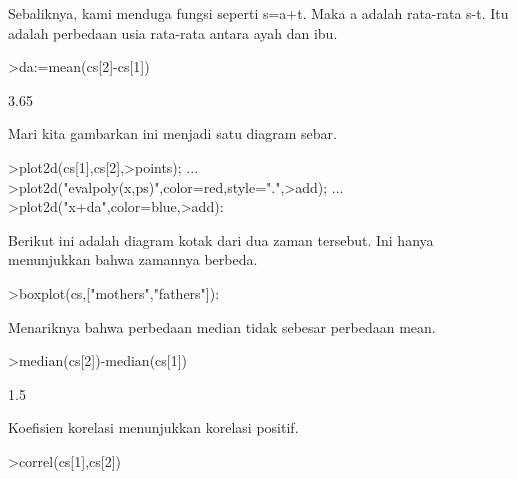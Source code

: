 \documentclass[a4paper,10pt]{article}
\begin{document}
\begin{eulernotebook}
\begin{eulercomment}
\begin{eulercomment}
\begin{eulercomment}
\begin{eulercomment}
\begin{eulercomment}
\begin{eulercomment}
\begin{eulercomment}
\begin{eulercomment}
\begin{eulercomment}
\begin{eulercomment}
\begin{eulercomment}
\begin{eulercomment}
\begin{eulercomment}
\begin{eulercomment}
\begin{eulercomment}
\begin{eulercomment}
\begin{eulercomment}
\begin{eulercomment}
\begin{eulercomment}
\begin{eulercomment}
\begin{eulercomment}
\begin{eulercomment}
\begin{eulercomment}
\begin{eulercomment}
\begin{eulercomment}
\begin{eulercomment}
\begin{eulercomment}
\begin{eulercomment}
\begin{eulercomment}
\begin{eulercomment}
\begin{eulercomment}
\begin{eulercomment}
\begin{eulercomment}
Sebaliknya, kami menduga fungsi seperti s=a+t. Maka a adalah rata-rata
s-t. Itu adalah perbedaan usia rata-rata antara ayah dan ibu.
\end{eulercomment}
\begin{eulerprompt}
>da:=mean(cs[2]-cs[1])
\end{eulerprompt}
\begin{euleroutput}
  3.65
\end{euleroutput}
\begin{eulercomment}
Mari kita gambarkan ini menjadi satu diagram sebar.
\end{eulercomment}
\begin{eulerprompt}
>plot2d(cs[1],cs[2],>points);  ...
>plot2d("evalpoly(x,ps)",color=red,style=".",>add);  ...
>plot2d("x+da",color=blue,>add):
\end{eulerprompt}
\begin{eulercomment}
Berikut ini adalah diagram kotak dari dua zaman tersebut. Ini hanya
menunjukkan bahwa zamannya berbeda.
\end{eulercomment}
\begin{eulerprompt}
>boxplot(cs,["mothers","fathers"]):
\end{eulerprompt}
\begin{eulercomment}
Menariknya bahwa perbedaan median tidak sebesar perbedaan mean.
\end{eulercomment}
\begin{eulerprompt}
>median(cs[2])-median(cs[1])
\end{eulerprompt}
\begin{euleroutput}
  1.5
\end{euleroutput}
\begin{eulercomment}
Koefisien korelasi menunjukkan korelasi positif.
\end{eulercomment}
\begin{eulerprompt}
>correl(cs[1],cs[2])
\end{eulerprompt}

\end{eulercomment}
\end{eulercomment}
\end{eulercomment}
\end{eulercomment}
\end{eulercomment}
\end{eulercomment}
\end{eulercomment}
\end{eulercomment}
\end{eulercomment}
\end{eulercomment}
\end{eulercomment}
\end{eulercomment}
\end{eulercomment}
\end{eulercomment}
\end{eulercomment}
\end{eulercomment}
\end{eulercomment}
\end{eulercomment}
\end{eulercomment}
\end{eulercomment}
\end{eulercomment}
\end{eulercomment}
\end{eulercomment}
\end{eulercomment}
\end{eulercomment}
\end{eulercomment}
\end{eulercomment}
\end{eulercomment}
\end{eulercomment}
\end{eulercomment}
\end{eulercomment}
\end{eulercomment}
\end{eulernotebook}
\end{document}
